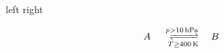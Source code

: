 \documentclass{article}
\begin{document}
\begin{center}
  left
  right
\end{center}
\[
  A
  \xrightleftharpoons[T \geq 400\,\mathrm{K}]{p > 10\,\mathrm{hPa}}
  B
\]
\end{document}
